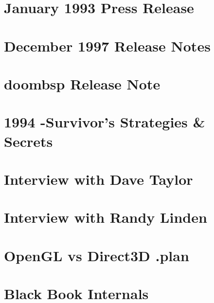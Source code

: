 \documentclass{book}
\begin{document}
      \chapter{January 1993 Press Release}
      
      \chapter{December 1997 Release Notes}
      
      \chapter{doombsp Release Note}
      
      \chapter{1994 -Survivor's Strategies \& Secrets}
      
   
      \chapter{Interview with Dave Taylor}
      
      \chapter{Interview with Randy Linden}
            
      \chapter{OpenGL vs Direct3D .plan}
      
        \chapter{Black Book Internals}
    
    \cleartoleftpage %
    
    \blankpage
    \blankpage
\end{document}
